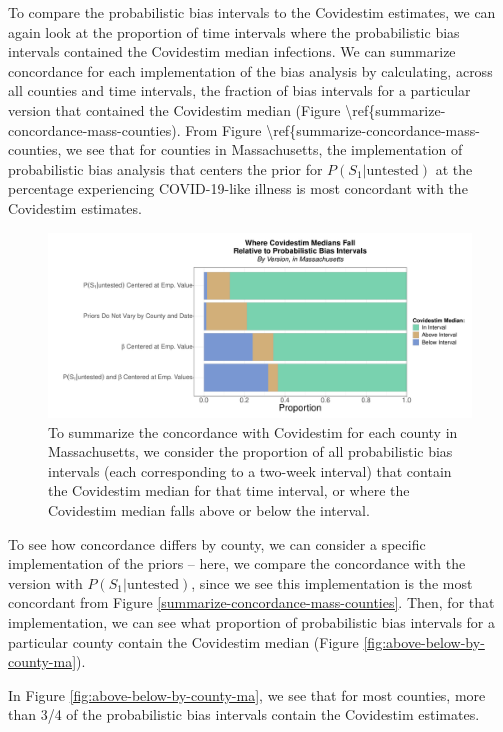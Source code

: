 \documentclass[12pt,twoside]{smiththesis}
\begin{document}
To compare the probabilistic bias intervals to the Covidestim estimates, we can again look at the proportion of time intervals where the probabilistic bias intervals contained the Covidestim median infections. We can summarize concordance for each implementation of the bias analysis by calculating, across all counties and time intervals, the fraction of bias intervals for a particular version that contained the Covidestim median (Figure \textbackslash ref\{summarize-concordance-mass-counties). From Figure \textbackslash ref\{summarize-concordance-mass-counties, we see that for counties in Massachusetts, the implementation of probabilistic bias analysis that centers the prior for \(P(S_1|\text{untested})\) at the percentage experiencing COVID-19-like illness is most concordant with the Covidestim estimates.
\begin{figure}
\includegraphics[width=1\linewidth]{figure/summarize-concordance-mass-counties} \caption{\label{fig:summarize-concordance-mass-counties} To summarize the concordance with Covidestim for each county in Massachusetts, we consider the proportion of all probabilistic bias intervals (each corresponding to a two-week interval) that contain the Covidestim median for that time interval, or where the Covidestim median falls above or below the interval.}\label{fig:unnamed-chunk-20}
\end{figure}
To see how concordance differs by county, we can consider a specific implementation of the priors -- here, we compare the concordance with the version with \(P(S_1|\text{untested})\), since we see this implementation is the most concordant from Figure \ref{summarize-concordance-mass-counties}. Then, for that implementation, we can see what proportion of probabilistic bias intervals for a particular county contain the Covidestim median (Figure \ref{fig:above-below-by-county-ma}).

In Figure \ref{fig:above-below-by-county-ma}, we see that for most counties, more than 3/4 of the probabilistic bias intervals contain the Covidestim estimates.
\end{document}
